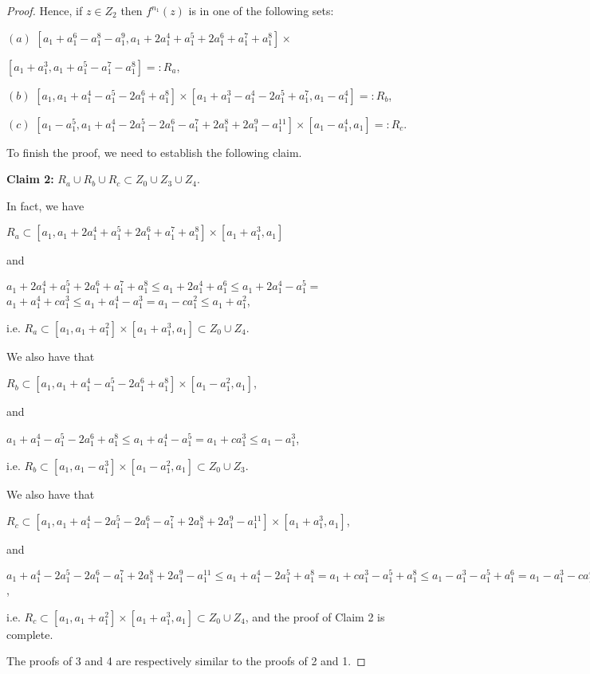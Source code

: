\documentclass[11pt]{amsart}
\theoremstyle{definition}
\begin{document}
\begin{proof}
\smallskip

Hence, if $z\in Z_2$ then $f^{n_1}(z)$ is in one of the following sets:

\noindent $(a)$ \noindent $[a_1+a_1^6-a_1^8-a_1^9,a_1+2a_1^4+a_1^5+2a_1^6+a_1^7+a_1^8]\times$ 

\hfill $[a_1+a_1^3,a_1+a_1^5-a_1^7-a_1^8]=: R_a$,

\noindent $(b)$ $[a_1,a_1+a_1^4-a_1^5-2a_1^6+a_1^8]\times[a_1+a_1^3-a_1^4-2a_1^5+a_1^7,a_1-a_1^4]=:R_b$,

\noindent $(c)$ $[a_1-a_1^5,a_1+a_1^4-2a_1^5-2a_1^6-a_1^7+2a_1^8+2a_1^9-a_1^{11}] \times[a_1-a_1^4,a_1]=: R_c$.

To finish the proof, we need to establish the following claim.

\smallskip 

\textbf{Claim 2:} $R_a\cup R_b\cup R_c\subset Z_0\cup Z_3\cup Z_4$.

\smallskip 
In fact, we have
\begin{center}
$R_a\subset [a_1,a_1+2a_1^4+a_1^5+2a_1^6+a_1^7+a_1^8]\times[a_1+a_1^3,a_1]$
\end{center}
and 
\begin{center}
$a_1+2a_1^4+a_1^5+2a_1^6+a_1^7+a_1^8\leq a_1+2a_1^4+a_1^6\leq a_1+2a_1^4-a_1^5=$ $a_1+a_1^4+ca_1^3\leq a_1+a_1^4-a_1^3=a_1-ca_1^2\leq a_1+a_1^2$,
\end{center}
i.e. $R_a\subset [a_1,a_1+a_1^2]\times[a_1+a_1^3,a_1]\subset Z_0\cup Z_4$.
\smallskip 

We also have that
\begin{center}
$R_b\subset [a_1,a_1+a_1^4-a_1^5-2a_1^6+a_1^8]\times[a_1-a_1^2,a_1]$,
\end{center}
and
\begin{center}
$a_1+a_1^4-a_1^5-2a_1^6+a_1^8\leq a_1+a_1^4-a_1^5= a_1+ca_1^3\leq a_1-a_1^3$,
\end{center}
i.e. $R_b\subset [a_1,a_1-a_1^3]\times[a_1-a_1^2,a_1]\subset Z_0\cup Z_3$.

\smallskip 

We also have that
\begin{center}
	$R_c\subset [a_1,a_1+a_1^4-2a_1^5-2a_1^6-a_1^7+2a_1^8+2a_1^9-a_1^{11}] \times[a_1+a_1^3,a_1]$,
\end{center}
and
\begin{center}
$a_1+a_1^4-2a_1^5-2a_1^6-a_1^7+2a_1^8+2a_1^9-a_1^{11}\leq a_1+a_1^4-2a_1^5+a_1^8= a_1+ca_1^3-a_1^5+a_1^8 \leq a_1-a_1^3-a_1^5+a_1^6 =a_1-a_1^3-ca_1^4\leq a_1-a_1^3+a_1^4=a_1-ca_1^2\leq a_1+a_1^2$,
\end{center}
i.e. $R_c\subset [a_1,a_1+a_1^2]\times[a_1+a_1^3,a_1]\subset Z_0\cup Z_4$, and the proof of Claim 2 is complete.

\smallskip

The proofs of 3 and 4 are respectively similar to the proofs of 2 and 1.
\end{proof}
\end{document}
